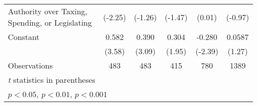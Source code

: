 {\begin{tabular}{l*{5}{c}}
Authority over Taxing, Spending, or Legislating&  (-2.25)         &  (-1.26)         &  (-1.47)         &   (0.01)         &  (-0.97)         \\
\addlinespace
Constant        &    0.582\sym{***}&    0.390\sym{**} &    0.304         &   -0.280\sym{*}  &   0.0587         \\
                &   (3.58)         &   (3.09)         &   (1.95)         &  (-2.39)         &   (1.27)         \\
\midrule
Observations    &      483         &      483         &      415         &      780         &     1389         \\
\bottomrule
\multicolumn{6}{l}{\footnotesize \textit{t} statistics in parentheses}\\
\multicolumn{6}{l}{\footnotesize \sym{*} \(p<0.05\), \sym{**} \(p<0.01\), \sym{***} \(p<0.001\)}\\
\end{tabular}
}
